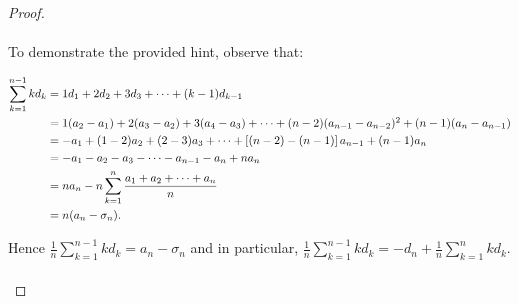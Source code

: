    \begin{proof}\ \\\\

        To demonstrate the provided hint, observe that:

        \renewcommand*{\thefootnote}{\fnsymbol{footnote}}
        \begin{align*}
            \sum\limits_{k=1}^{n-1}{kd_k} &= 1d_1 + 2d_2 + 3d_3 + \cdots + (k - 1)d_{k-1} \\
                                          &= 1(a_2 - a_1) 
                                           + 2(a_3 - a_2)
                                           + 3(a_4 - a_3)
                                           + \cdots
                                           + (n - 2)(a_{n-1} - a_{n-2})\footnotemark[2]
                                           + (n - 1)(a_n - a_{n-1}) \\
                                          &= -a_1 
                                             + (1 - 2)a_2 
                                             + (2 - 3)a_3
                                             +  \cdots
                                             +  \left[(n - 2) - (n - 1)\right]a_{n-1}
                                             + (n-1)a_{n} \\
                                          &= -a_1 
                                             - a_2
                                             - a_3 
                                             - \cdots
                                             - a_{n-1}
                                             - a_n + na_{n} \\
                                          &= na_n - n\sum\limits_{k=1}^{n}{\frac{a_1 + a_2 + \cdots + a_n}{n}} \\
                                          &= n(a_n - \sigma_n).
        \end{align*}

        Hence $\frac{1}{n}\sum\limits_{k=1}^{n-1}{kd_k} = a_n - \sigma_n$ and
        in particular, $\frac{1}{n}\sum\limits_{k=1}^{n-1}{kd_k} =  - d_n + \frac{1}{n}\sum\limits_{k=1}^{n}{kd_k}$.
        \\\\



\end{proof}
